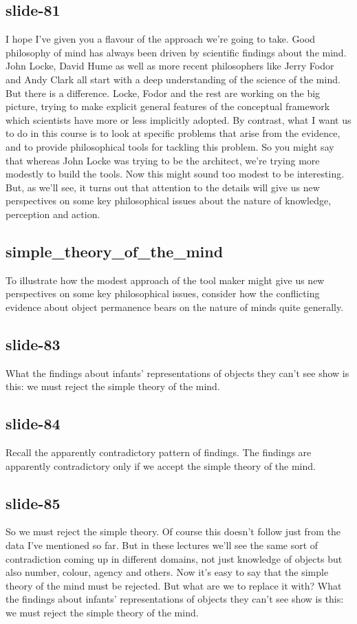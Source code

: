 \documentclass[12pt,\papersize]{extarticle}
\begin{document}
 
\subsection{slide-81}
I hope I've given you a flavour of the approach we're going to take.
Good philosophy of mind has always been driven by scientific findings about the mind.
John Locke, David Hume as well as more recent philosophers like Jerry Fodor and Andy Clark all start with a deep understanding of the science of the mind.
But there is a difference.
Locke, Fodor and the rest are working on the big picture, trying to make explicit general features of the conceptual framework which scientists have more or less implicitly adopted.
By contrast, what I want us to do in this course is to look at specific problems that arise from the evidence,
and to provide philosophical tools for tackling this problem.
So you might say that whereas John Locke was trying to be the architect, we're trying more modestly to build the tools.
Now this might sound too modest to be interesting.
But, as we'll see, it turns out that attention to the details will give us new perspectives on some key philosophical issues about the nature of knowledge, perception and action.
 
 
\subsection{simple\_theory\_of\_the\_mind}
To illustrate how the modest approach of the tool maker might give us new perspectives on some key philosophical issues,
consider how the conflicting evidence about object permanence bears on the nature of minds quite generally.
 
 
\subsection{slide-83}
What the findings about infants' representations of objects they can't see show is this:
we must reject the simple theory of the mind.
 
 
\subsection{slide-84}
Recall the apparently contradictory pattern of findings.
The findings are apparently contradictory only if we accept the simple theory of the mind.
 
 
\subsection{slide-85}
So we must reject the simple theory.
Of course this doesn't follow just from the data I've mentioned so far.
But in these lectures we'll see the same sort of contradiction coming up in different domains, not just knowledge of objects but also number, colour, agency and others.
Now it's easy to say that the simple theory of the mind must be rejected.
But what are we to replace it with?
What the findings about infants' representations of objects they can't see show is this:
we must reject the simple theory of the mind.
 
\end{document}
